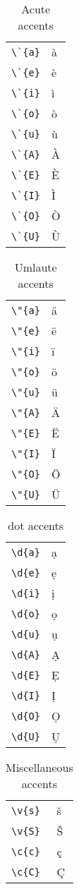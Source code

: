 \documentclass{article}
\begin{document}
\begin{table}
\begin{center}
\begin{tabular}{ll}
\verb#\`{a}#& \`{a}\\
\verb#\`{e}#& \`{e}\\
\verb#\`{i}#& \`{i}\\
\verb#\`{o}#& \`{o}\\
\verb#\`{u}#& \`{u}\\
\verb#\`{A}#& \`{A}\\
\verb#\`{E}#& \`{E}\\
\verb#\`{I}#& \`{I}\\
\verb#\`{O}#& \`{O}\\
\verb#\`{U}#& \`{U}\\
\end{tabular}
\caption{Acute accents}
\end{center}
\end{table}

\begin{table}
\begin{center}
\begin{tabular}{ll}
\verb#\"{a}#& \"{a}\\
\verb#\"{e}#& \"{e}\\
\verb#\"{i}#& \"{i}\\
\verb#\"{o}#& \"{o}\\
\verb#\"{u}#& \"{u}\\
\verb#\"{A}#& \"{A}\\
\verb#\"{E}#& \"{E}\\
\verb#\"{I}#& \"{I}\\
\verb#\"{O}#& \"{O}\\
\verb#\"{U}#& \"{U}\\
\end{tabular}
\caption{Umlaute accents}
\end{center}
\end{table}

\begin{table}
\begin{center}
\begin{tabular}{ll}
\verb#\d{a}#& \d{a}\\
\verb#\d{e}#& \d{e}\\
\verb#\d{i}#& \d{i}\\
\verb#\d{o}#& \d{o}\\
\verb#\d{u}#& \d{u}\\
\verb#\d{A}#& \d{A}\\
\verb#\d{E}#& \d{E}\\
\verb#\d{I}#& \d{I}\\
\verb#\d{O}#& \d{O}\\
\verb#\d{U}#& \d{U}\\
\end{tabular}
\caption{dot accents}
\end{center}
\end{table}

\begin{table}
\begin{center}
\begin{tabular}{ll}
\verb#\v{s}#& \v{s}\\
\verb#\v{S}#& \v{S}\\
\verb#\c{c}#& \c {c}\\
\verb#\c{C}#& \c {C}\\
\end{tabular}
\caption{Miscellaneous accents}
\end{center}
\end{table}
\end{document}
